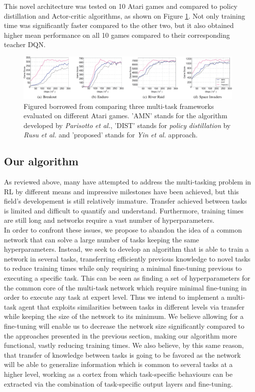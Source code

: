 \documentclass{article}
\begin{document}
This novel architecture was tested on 10 Atari games and compared to policy distillation and Actor-critic algorithms, as shown on Figure \ref{fig:comparison}. Not only training time was significantly faster compared to the other two, but it also obtained higher mean performance on all 10 games compared to their corresponding teacher DQN.\\
\begin{figure}[H]
    \centering
    \includegraphics[width=\textwidth]{figs/comparison.png}
    \caption{Figured borrowed from \citep{YinKnowledgeReplay} comparing three multi-task frameworks evaluated on different Atari games. 'AMN' stands for the algorithm developed by \textit{Parisotto et al.}, 'DIST' stands for \textit{policy distillation} by \textit{Rusu et al.} and 'proposed' stands for \textit{Yin et al.} approach.}
    \label{fig:comparison}
\end{figure}
\subsection{Our algorithm}
As reviewed above, many have attempted to address the multi-tasking problem in RL by different means and impressive milestones have been achieved, but this field's developement is still relatively immature. Transfer achieved between tasks is limited and difficult to quantify and understand. Furthermore, training times are still long and networks require a vast number of hyperparameters.\\ 
In order to confront these issues, we propose to abandon the idea of a common network that can solve a large number of tasks keeping the same hyperparameters. Instead, we seek to develop an algorithm that is able to train a network in several tasks, transferring efficiently previous knowledge to novel tasks to reduce training times while only requiring a minimal fine-tuning previous to executing a specific task. This can be seen as finding a set of hyperparameters for the common core of the multi-task network which require minimal fine-tuning in order to execute any task at expert level. Thus we intend to implement a multi-task agent that exploits similarities between tasks in different levels via transfer while keeping the size of the network to its minimum. We believe allowing for a fine-tuning will enable us to decrease the network size significantly compared to the approaches presented in the previous section, making our algorithm more functional, vastly reducing training times. We also believe, by this same reason, that transfer of knowledge between tasks is going to be favored as the network will be able to generalize information which is common to several tasks at a higher level, working as a cortex from which task-specific behaviours can be extracted via the combination of task-specific output layers and fine-tuning.\\
\end{document}
